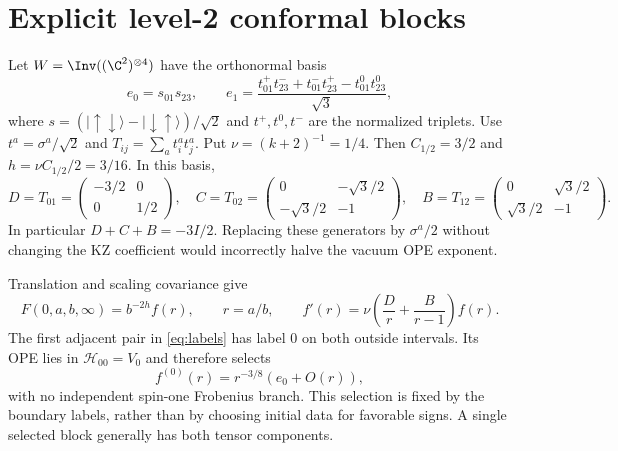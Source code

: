 \section{Explicit level-2 conformal blocks}
\label{sec:blocks}

Let $W=\Inv((\C^2)^{\otimes4})$ have the orthonormal basis
\begin{equation}
 e_0=s_{01}s_{23},\qquad
 e_1=\frac{t^+_{01}t^-_{23}+t^-_{01}t^+_{23}-t^0_{01}t^0_{23}}{\sqrt3},
\end{equation}
where $s=(|\uparrow\downarrow\rangle-|\downarrow\uparrow\rangle)/\sqrt2$
and $t^+,t^0,t^-$ are the normalized triplets. Use
$t^a=\sigma^a/\sqrt2$ and $T_{ij}=\sum_a t_i^at_j^a$. Put
$\nu=(k+2)^{-1}=1/4$. Then $C_{1/2}=3/2$ and
$h=\nu C_{1/2}/2=3/16$. In this basis,
\begin{equation}
 D=T_{01}=\begin{pmatrix}-3/2&0\\0&1/2\end{pmatrix},\quad
 C=T_{02}=\begin{pmatrix}0&-\sqrt3/2\\-\sqrt3/2&-1\end{pmatrix},\quad
 B=T_{12}=\begin{pmatrix}0&\sqrt3/2\\\sqrt3/2&-1\end{pmatrix}.
 \label{eq:matrices}
\end{equation}
In particular $D+C+B=-3I/2$. Replacing these generators by $\sigma^a/2$
without changing the KZ coefficient would incorrectly halve the vacuum
OPE exponent.

Translation and scaling covariance give
\begin{equation}
 F(0,a,b,\infty)=b^{-2h}f(r),\qquad r=a/b,\qquad
 f'(r)=\nu\left(\frac Dr+\frac B{r-1}\right)f(r).
 \label{eq:kz}
\end{equation}
The first adjacent pair in \eqref{eq:labels} has label $0$ on both outside
intervals. Its OPE lies in $\mathcal H_{00}=V_0$ and therefore selects
\begin{equation}
 f^{(0)}(r)=r^{-3/8}(e_0+O(r)),
 \label{eq:selection}
\end{equation}
with no independent spin-one Frobenius branch. This selection is fixed by
the boundary labels, rather than by choosing initial data for favorable
signs. A single selected block generally has both tensor components.

